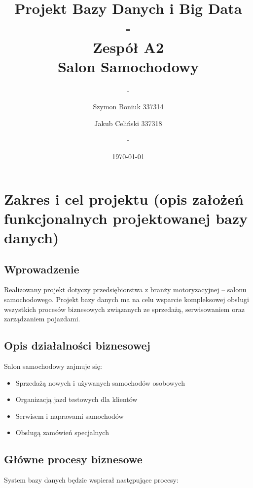 \documentclass[a4paper,titleauthor]{mwart}
\title{{\Huge  Projekt Bazy Danych i Big Data}
\\ - \\
{\Large Zespół A2}\\ {\Large Salon Samochodowy}}
\author{ - \and Szymon Boniuk 337314 \and Jakub Celiński 337318 \and - }
\affil{Politechnika Warszawska, Wydział EiTI}
\date{\today}
\begin{document}
	
	\maketitle
	
	\newpage
	\tableofcontents
	\newpage
	\section{Zakres i cel projektu (opis założeń funkcjonalnych projektowanej bazy danych)}
	
	\subsection{Wprowadzenie}
	
	Realizowany projekt dotyczy przedsiębiorstwa z branży motoryzacyjnej -- salonu samochodowego. Projekt bazy danych ma na celu wsparcie kompleksowej obsługi wszystkich procesów biznesowych związanych ze sprzedażą, serwisowaniem oraz zarządzaniem pojazdami.
	
	\subsection{Opis działalności biznesowej}
	
	Salon samochodowy zajmuje się:
	\begin{itemize}
		\item Sprzedażą nowych i używanych samochodów osobowych
		\item Organizacją jazd testowych dla klientów
		\item Serwisem i naprawami samochodów
		\item Obsługą zamówień specjalnych
	\end{itemize}
	
	\subsection{Główne procesy biznesowe}
	
	System bazy danych będzie wspierał następujące procesy:
	
\end{document}
